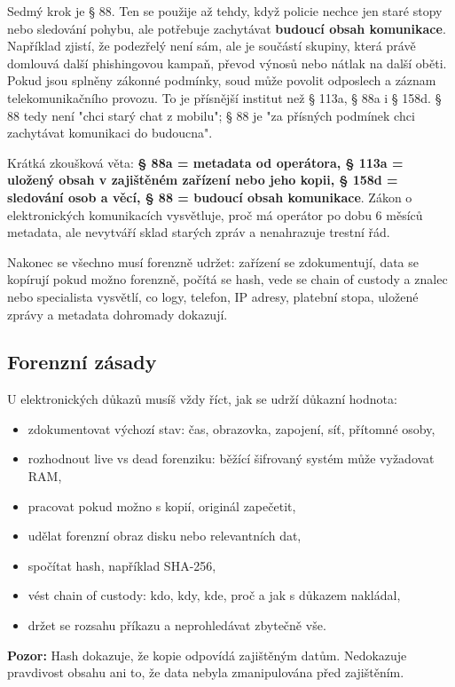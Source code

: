 \documentclass[11pt,a4paper]{article}
\newcommand{\pozor}[1]{\begin{tcolorbox}[breakable,enhanced,colback=red!7,colframe=red!30!black,boxrule=0pt,arc=1mm,left=5pt,right=5pt,top=5pt,bottom=5pt,before skip=6pt,after skip=6pt]\textbf{Pozor:} #1\end{tcolorbox}}
\begin{document}
{Sedmý krok je § 88. Ten se použije až tehdy, když policie nechce jen staré stopy nebo sledování pohybu, ale potřebuje zachytávat \textbf{budoucí obsah komunikace}. Například zjistí, že podezřelý není sám, ale je součástí skupiny, která právě domlouvá další phishingovou kampaň, převod výnosů nebo nátlak na další oběti. Pokud jsou splněny zákonné podmínky, soud může povolit odposlech a záznam telekomunikačního provozu. To je přísnější institut než § 113a, § 88a i § 158d. § 88 tedy není "chci starý chat z mobilu"; § 88 je "za přísných podmínek chci zachytávat komunikaci do budoucna".

Krátká zkoušková věta: \textbf{§ 88a = metadata od operátora, § 113a = uložený obsah v zajištěném zařízení nebo jeho kopii, § 158d = sledování osob a věcí, § 88 = budoucí obsah komunikace}. Zákon o elektronických komunikacích vysvětluje, proč má operátor po dobu 6 měsíců metadata, ale nevytváří sklad starých zpráv a nenahrazuje trestní řád.

Nakonec se všechno musí forenzně udržet: zařízení se zdokumentují, data se kopírují pokud možno forenzně, počítá se hash, vede se chain of custody a znalec nebo specialista vysvětlí, co logy, telefon, IP adresy, platební stopa, uložené zprávy a metadata dohromady dokazují.}

\subsection*{Forenzní zásady}
U elektronických důkazů musíš vždy říct, jak se udrží důkazní hodnota:
\begin{itemize}
  \item zdokumentovat výchozí stav: čas, obrazovka, zapojení, síť, přítomné osoby,
  \item rozhodnout live vs dead forenziku: běžící šifrovaný systém může vyžadovat RAM,
  \item pracovat pokud možno s kopií, originál zapečetit,
  \item udělat forenzní obraz disku nebo relevantních dat,
  \item spočítat hash, například SHA-256,
  \item vést chain of custody: kdo, kdy, kde, proč a jak s důkazem nakládal,
  \item držet se rozsahu příkazu a neprohledávat zbytečně vše.
\end{itemize}

\pozor{Hash dokazuje, že kopie odpovídá zajištěným datům. Nedokazuje pravdivost obsahu ani to, že data nebyla zmanipulována před zajištěním.}
\end{document}
